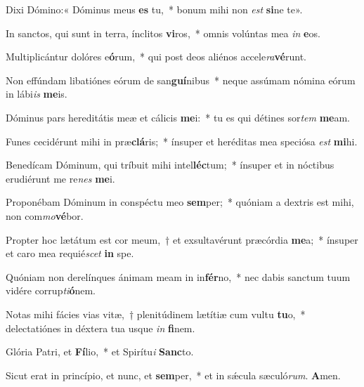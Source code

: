 \item [Consérva me, \textbf{De}us,~* quóniam sperá\textit{vi} \textbf{in} te.]

\item Dixi Dómino:« Dóminus meus \textbf{es} tu,~* bonum mihi non \textit{est} \textbf{si}ne te».

\item In sanctos, qui sunt in terra, ínclitos \textbf{vi}ros,~* omnis volúntas mea \textit{in} \textbf{e}os.

\item Multiplicántur dolóres e\textbf{ó}rum,~* qui post deos aliénos accele\textit{ra}\textbf{vé}runt.

\item Non effúndam libatiónes eórum de san\textbf{guí}nibus~* neque assúmam nómina eórum in lábi\textit{is} \textbf{me}is.

\item Dóminus pars hereditátis meæ et cálicis \textbf{me}i:~* tu es qui détines sor\textit{tem} \textbf{me}am.

\item Funes cecidérunt mihi in præ\textbf{clá}ris;~* ínsuper et heréditas mea speciósa \textit{est} \textbf{mi}hi.

\item Benedícam Dóminum, qui tríbuit mihi intel\textbf{léc}tum;~* ínsuper et in nóctibus erudiérunt me re\textit{nes} \textbf{me}i.

\item Proponébam Dóminum in conspéctu meo \textbf{sem}per;~* quóniam a dextris est mihi, non com\textit{mo}\textbf{vé}bor.

\item Propter hoc lætátum est cor meum,~† et exsultavérunt præcórdia \textbf{me}a;~* ínsuper et caro mea requié\textit{scet} \textbf{in} spe.

\item Quóniam non derelínques ánimam meam in in\textbf{fér}no,~* nec dabis sanctum tuum vidére corrup\textit{ti}\textbf{ó}nem.

\item Notas mihi fácies vias vitæ,~† plenitúdinem lætítiæ cum vultu \textbf{tu}o,~* delectatiónes in déxtera tua usque \textit{in} \textbf{fi}nem.

\item Glória Patri, et \textbf{Fí}lio,~* et Spirítu\textit{i} \textbf{Sanc}to.

\item Sicut erat in princípio, et nunc, et \textbf{sem}per,~* et in sǽcula sæculó\textit{rum}. \textbf{A}men.

